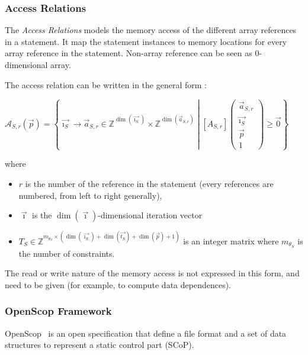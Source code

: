\documentclass[paper=a4, fontsize=11pt]{scrartcl}
\numberwithin{equation}{section}        %
\numberwithin{figure}{section}          %
\numberwithin{table}{section}               %
\begin{document}
            \subsubsection{Access Relations}
                The \textit{Access Relations} models the memory access of the different
                array references in a statement. It map the statement instances to memory locations
                for every array reference in the statement. Non-array reference can be seen as
                0-dimensional array.

                The access relation can be written in the general form :
                \begin{center}
                    $\mathcal{A}_{S,r}(\vec{p}) = 
                    \left\{
                        \vec{\imath_S} \to \vec{a}_{S,r} \in \mathbb{Z}^{\dim(\vec{\imath_S})}\times\mathbb{Z}^{\dim(\vec{a}_{S,r})}
                        \middle|
                        \left[A_{S,r}\right]\left(\begin{array}{c}\vec{a}_{S,r}\\\vec{\imath_S}\\\vec{p}\\1\end{array}\right)
                        \geq \vec{0}
                    \right\}$
                \end{center}
                where 
                \begin{itemize}
                    \item $r$ is the number of the reference in the statement (every references are
                        numbered, from left to right generally),
                    \item $\vec{\imath}$ is the $\dim(\vec{\imath})$-dimensional iteration vector
                    \item $T_S \in \mathbb{Z}^{m_{\theta_S}\times(\dim(\vec{\imath_S})+\dim(\vec{t_S})+\dim(\vec{p})+1)}$
                        is an integer matrix where $m_{\theta_S}$ is the number of constraints.
                \end{itemize}

                The read or write nature of the memory access is not expressed in this form,
                and need to be given (for example, to compute data dependences).

            \subsubsection{OpenScop Framework}
                OpenScop~\cite{openscop} is an open specification that define a file format
                and a set of data structures to represent a static control part (SCoP).
\end{document}

